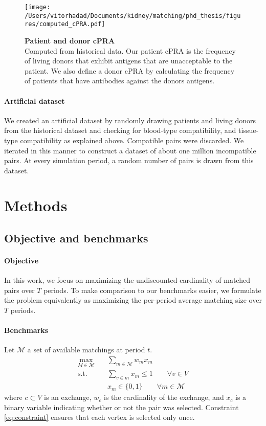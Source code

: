 \begin{itemize}
\begin{figure}
\centering
\texttt{[image: /Users/vitorhadad/Documents/kidney/matching/phd\_thesis/figures/computed\_cPRA.pdf]}
\caption{\textbf{Patient and donor cPRA} \\
    Computed from historical data. Our patient cPRA is the frequency of living donors that exhibit antigens that are unacceptable to the patient. We also define a donor cPRA by calculating the frequency of patients that have antibodies against the donors antigens.}
\label{fig:cpra}
\end{figure}


\paragraph{Artificial dataset} We created an artificial dataset by randomly drawing patients and living donors from the historical dataset and checking for blood-type compatibility, and tissue-type compatibility as explained above. Compatible pairs were discarded. We iterated in this manner to construct a dataset of about one million incompatible pairs. At every simulation period, a random number of pairs is drawn from this dataset.


\section{Methods}

\subsection{Objective and benchmarks}

\paragraph{Objective} In this work, we focus on maximizing the undiscounted cardinality of matched pairs over $T$ periods. To make comparison to our benchmarks easier, we formulate the problem equivalently as maximizing the per-period average matching size over $T$ periods. 


\paragraph{Benchmarks} Let $\mathcal{M}$ a set of available matchings at period $t$.
\begin{align}
  \max_{M \in \mathcal{M}}  &\sum_{m \in \mathcal{M}} w_{m} x_{m} \\
  \text{s.t.} \qquad &\sum_{v \in m} x_{m} \leq 1  \qquad   \forall v \in V\\ \label{eq:constraint}
        &x_{m} \in \{ 0, 1 \} \qquad   \forall m \in \mathcal{M}   
\end{align}
\noindent where $c \subset V$ is an exchange, $w_{c}$ is the cardinality of the exchange, and $x_c$ is a binary variable indicating whether or not the pair was selected. Constraint \ref{eq:constraint} ensures that each vertex is selected only once.


\end{itemize}
